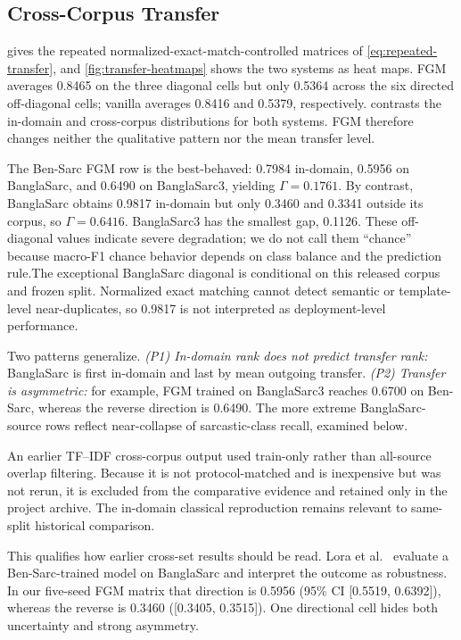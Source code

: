 \documentclass{ieeeaccess}
\begin{document}
\subsection{Cross-Corpus Transfer}
\label{sec:cross-dataset-results}

 gives the repeated normalized-exact-match-controlled matrices of \cref{eq:repeated-transfer}, and \cref{fig:transfer-heatmaps} shows the two systems as heat maps. FGM averages 0.8465 on the three diagonal cells but only 0.5364 across the six directed off-diagonal cells; vanilla averages 0.8416 and 0.5379, respectively.  contrasts the in-domain and cross-corpus distributions for both systems. FGM therefore changes neither the qualitative pattern nor the mean transfer level.

The Ben-Sarc FGM row is the best-behaved: 0.7984 in-domain, 0.5956 on BanglaSarc, and 0.6490 on BanglaSarc3, yielding $\Gamma=0.1761$. By contrast, BanglaSarc obtains 0.9817 in-domain but only 0.3460 and 0.3341 outside its corpus, so $\Gamma=0.6416$. BanglaSarc3 has the smallest gap, 0.1126. These off-diagonal values indicate severe degradation; we do not call them ``chance'' because macro-F1 chance behavior depends on class balance and the prediction rule.The exceptional BanglaSarc diagonal is conditional on this released corpus and
frozen split. Normalized exact matching cannot detect semantic or template-level
near-duplicates, so 0.9817 is not interpreted as deployment-level performance.

Two patterns generalize. \emph{(P1) In-domain rank does not predict transfer rank:} BanglaSarc is first in-domain and last by mean outgoing transfer. \emph{(P2) Transfer is asymmetric:} for example, FGM trained on BanglaSarc3 reaches 0.6700 on Ben-Sarc, whereas the reverse direction is 0.6490. The more extreme BanglaSarc-source rows reflect near-collapse of sarcastic-class recall, examined below.

An earlier TF--IDF cross-corpus output used train-only rather than all-source overlap filtering. Because it is not protocol-matched and is inexpensive but was not rerun, it is excluded from the comparative evidence and retained only in the project archive. The in-domain classical reproduction remains relevant to same-split historical comparison.

This qualifies how earlier cross-set results should be read. Lora et al.\ \cite{lora2023transformer} evaluate a Ben-Sarc-trained model on BanglaSarc and interpret the outcome as robustness. In our five-seed FGM matrix that direction is 0.5956 (95\% CI [0.5519, 0.6392]), whereas the reverse is 0.3460 ([0.3405, 0.3515]). One directional cell hides both uncertainty and strong asymmetry.
\end{document}
